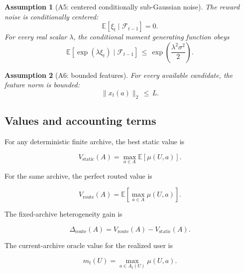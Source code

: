 \documentclass{article} %
\newtheorem{assumption}{Assumption}
\begin{document}
\begin{assumption}[A5: centered conditionally sub-Gaussian noise]
\label{ass:app-noise}
The reward noise is conditionally centered:
\begin{equation}
\label{eq:app-ass-noise-mean}
\mathbb{E}[\xi_t\mid \mathcal{F}_{t-1}] = 0.
\end{equation}
For every real scalar \(\lambda\), the conditional moment generating function obeys
\begin{equation}
\label{eq:app-ass-noise-subg}
\mathbb{E}\!\left[\exp(\lambda \xi_t)\mid \mathcal{F}_{t-1}\right]
\,\le\,
\exp\!\left(\frac{\lambda^2\sigma^2}{2}\right).
\end{equation}
\end{assumption}

\begin{assumption}[A6: bounded features]
\label{ass:app-features}
For every available candidate, the feature norm is bounded:
\begin{equation}
\label{eq:app-ass-feature-bound}
\|x_t(a)\|_2 \,\le\, L.
\end{equation}
\end{assumption}

\subsection{Values and accounting terms}

For any deterministic finite archive, the best static value is

\begin{equation}
\label{eq:app-vstatic}
V_{\mathrm{static}}(A)
=
\max_{a\in A}\mathbb{E}[\mu(U,a)].
\end{equation}

For the same archive, the perfect routed value is

\begin{equation}
\label{eq:app-vroute}
V_{\mathrm{route}}(A)
=
\mathbb{E}\!\left[\max_{a\in A}\mu(U,a)\right].
\end{equation}

The fixed-archive heterogeneity gain is

\begin{equation}
\label{eq:app-delta-het}
\Delta_{\mathrm{route}}(A)
=
V_{\mathrm{route}}(A)-V_{\mathrm{static}}(A).
\end{equation}

The current-archive oracle value for the realized user is

\begin{equation}
\label{eq:app-mt}
m_t(U)
=
\max_{a\in A_t(U)} \mu(U,a).
\end{equation}
\end{document}
